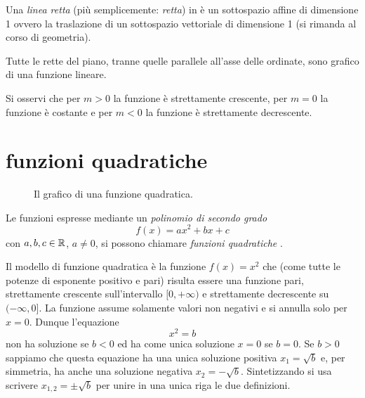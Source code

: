 \begin{definition}[retta]
  Una \emph{linea retta} (più semplicemente: \emph{retta}) in è un sottospazio affine di dimensione 1 
  ovvero la traslazione di un sottospazio vettoriale di dimensione 1
  (si rimanda al corso di geometria).
\end{definition}

Tutte le rette del piano, 
tranne quelle parallele all'asse delle ordinate,
sono grafico di una funzione lineare.

Si osservi che per $m>0$ la funzione è strettamente crescente,
per $m=0$ la funzione è costante e per $m<0$ la funzione è
strettamente decrescente.

\section{funzioni quadratiche}
\label{sec:funzioni_quadratiche}

\begin{figure}
  \begin{center}
  \end{center}
  \caption{Il grafico di una funzione quadratica.}
  \label{fig:funzione_quadratica}
\end{figure}

Le funzioni espresse mediante un \emph{polinomio di secondo grado}%
%
\begin{equation}\label{eq:funzione_quadratica}
  f(x) = ax^2 + bx +c
\end{equation}
con $a,b,c\in {\mathbb R}$, $a\neq 0$, si possono chiamare
\emph{funzioni quadratiche}%
%
.

Il modello di funzione quadratica è la funzione
$f(x) = x^2$ che (come tutte le potenze di esponente positivo e pari)
risulta essere una funzione pari, strettamente crescente
sull'intervallo $[0,+\infty)$ e strettamente decrescente
su $(-\infty,0]$. La funzione assume solamente valori non negativi
e si annulla solo per $x=0$.
Dunque l'equazione
\[
  x^2 = b
\]
non ha soluzione se $b<0$ ed ha come unica soluzione $x=0$ se $b=0$.
Se $b>0$ sappiamo che
questa equazione ha una unica soluzione positiva $x_1 = \sqrt{b}$
e, per simmetria, ha anche una soluzione negativa $x_2 = -\sqrt{b}$.
Sintetizzando si usa scrivere $x_{1,2} = \pm \sqrt{b}$
per unire in una unica riga le due definizioni.

